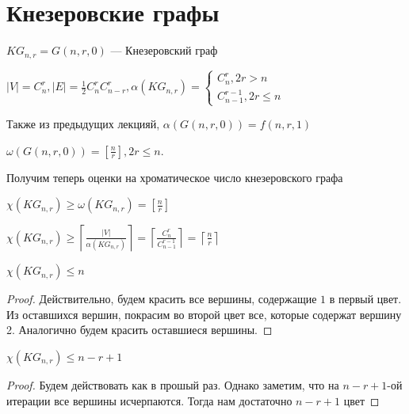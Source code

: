 

\section{Кнезеровские графы}

\begin{definition}
    \(KG_{n, r} = G(n, r, 0)\) --- Кнезеровский граф
\end{definition}

\begin{note}
    \(|V| = C_n^r, |E| = \frac{1}{2}C_n^rC_{n - r}^r, \alpha(KG_{n, r}) = \left\{\begin{array}{l}
        C_n^r, 2r > n \\
        C_{n - 1}^{r - 1}, 2r \le n
    \end{array}\right.\)

    Также из предыдущих лекцияй, \(\alpha(G(n, r, 0)) = f(n, r, 1)\)
\end{note}

\begin{note}
    \(\omega(G(n, r, 0)) = \left[\frac{n}{r}\right], 2r \le n\).
\end{note}

Получим теперь оценки на хроматическое число кнезеровского графа

\begin{note}
    \(\chi(KG_{n, r}) \ge \omega(KG_{n, r}) = \left[\frac{n}{r}\right]\)
\end{note}

\begin{note}
    \(\chi(KG_{n, r}) \ge \left\lceil \frac{|V|}{\alpha(KG_{n, r})} \right\rceil = \left\lceil\frac{C_n^r}{C_{n - 1}^{r - 1}}\right\rceil = \left\lceil\frac{n}{r}\right\rceil\)
\end{note}

\begin{note}
    \(\chi(KG_{n, r}) \le n\)
\end{note}
\begin{proof}
    Действительно, будем красить все вершины, содержащие \(1\) в первый цвет. Из оставшихся вершин, покрасим во второй цвет все, которые содержат вершину 2. Аналогично будем красить оставшиеся вершины.
\end{proof}

\begin{note}
    \(\chi(KG_{n, r}) \le n - r + 1\)
\end{note}
\begin{proof}
    Будем действовать как в прошый раз. Однако заметим, что на \(n - r + 1\)-ой итерации все вершины исчерпаются. Тогда нам достаточно \(n - r + 1\) цвет
\end{proof}

